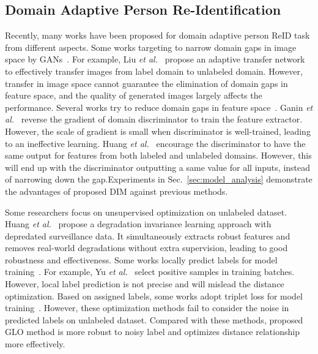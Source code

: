 \documentclass[sigconf]{acmart}
\begin{document}
\subsection{Domain Adaptive Person Re-Identification}
Recently, many works have been proposed for domain adaptive person ReID task from different aspects. Some works targeting to narrow domain gaps in image space by GANs~\cite{msmt, zhong2018generalizing, Chen_2019_ICCV, huang2019sbsgan, Liu_2019_CVPR, Li_2019_ICCV}. For example, Liu \textit{et al.}~\cite{Liu_2019_CVPR} propose an adaptive transfer network to effectively transfer images from label domain to unlabeled domain. However, transfer in image space cannot guarantee the elimination of domain gaps in feature space, and the quality of generated images largely affects the performance.
Several works try to reduce domain gaps in feature space~\cite{ huang2019domain, ganin2016domain}. Ganin \textit{et al.}~\cite{ganin2016domain} reverse the gradient of domain discriminator to train the feature extractor. However, the scale of gradient is small when discriminator is well-trained, leading to an ineffective learning. Huang \textit{et al.}~\cite{huang2019domain} encourage the discriminator to have the same output for features from both labeled and unlabeled domains. However, this will end up with the discriminator outputting a same value for all inputs, instead of narrowing down the gap.Experiments in Sec.~\ref{sec:model_analysis} demonstrate the advantages of proposed DIM against previous methods.

Some researchers focus on unsupervised optimization on unlabeled dataset. Huang \textit{et al.}~\cite{huang2020real} propose a degradation invariance learning approach with depredated surveillance data. It simultaneously extracts robust features and removes real-world degradations without extra supervision, leading to good robustness and effectiveness. Some works locally predict labels for model training~\cite{zhong2019invariance, yu2019unsupervised}. For example, Yu \textit{et al.}~\cite{yu2019unsupervised} select positive samples in training batches. However, local label prediction is not precise and will mislead the distance optimization.
Based on assigned labels, some works adopt triplet loss for model training~\cite{adaptive-reid, ssg, Zhang_2019_ICCV, yu2019unsupervised}. However, these optimization methods fail to consider the noise in predicted labels on unlabeled dataset. Compared with these methods, proposed GLO method is more robust to noisy label and optimizes distance relationship more effectively.
\end{document}
